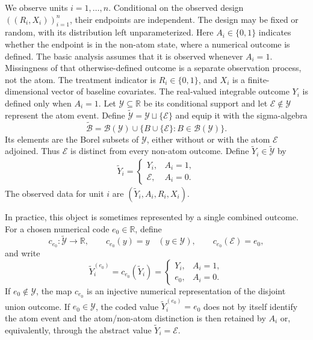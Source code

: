 \documentclass[11pt]{article}
\begin{document}
We observe units $i=1,\ldots,n$. Conditional on the observed design $((R_i,X_i))_{i=1}^n$, their endpoints are independent. The design may be fixed or random, with its distribution left unparameterized. Here $A_i\in\{0,1\}$ indicates whether the endpoint is in the non-atom state, where a numerical outcome is defined. The basic analysis assumes that it is observed whenever $A_i=1$. Missingness of that otherwise-defined outcome is a separate observation process, not the atom. The treatment indicator is $R_i\in\{0,1\}$, and $X_i$ is a finite-dimensional vector of baseline covariates. The real-valued integrable outcome $Y_i$ is defined only when $A_i=1$. Let $\mathcal{Y}\subseteq\mathbb{R}$ be its conditional support and let $\mathcal{E}\notin\mathcal{Y}$ represent the atom event. Define $\widetilde{\mathcal{Y}}=\mathcal{Y}\sqcup\{\mathcal{E}\}$ and equip it with the sigma-algebra
\[
\widetilde{\mathcal{B}}
  =\mathcal{B}(\mathcal{Y})
  \cup\{B\cup\{\mathcal{E}\}\colon B\in\mathcal{B}(\mathcal{Y})\}.
\]
Its elements are the Borel subsets of $\mathcal{Y}$, either without or with the atom $\mathcal{E}$ adjoined. Thus $\mathcal{E}$ is distinct from every non-atom outcome. Define $\widetilde{Y}_i\in\widetilde{\mathcal{Y}}$ by
\begin{align*}
  \widetilde{Y}_i
  =
  \begin{cases}
    Y_i, & A_i=1,\\
    \mathcal{E}, & A_i=0.
  \end{cases}
\end{align*}
The observed data for unit $i$ are $(\widetilde{Y}_i,A_i,R_i,X_i)$.

In practice, this object is sometimes represented by a single combined outcome. For a chosen numerical code $e_0\in\mathbb{R}$, define
\[
  c_{e_0}:\widetilde{\mathcal{Y}}\to\mathbb{R},
  \qquad
  c_{e_0}(y)=y \quad (y\in\mathcal{Y}),
  \qquad
  c_{e_0}(\mathcal{E})=e_0,
\]
and write
\[
  \widetilde{Y}_i^{(e_0)}
  =c_{e_0}(\widetilde{Y}_i)
  =
  \begin{cases}
    Y_i, & A_i=1,\\
    e_0, & A_i=0.
  \end{cases}
\]
If $e_0\notin\mathcal{Y}$, the map $c_{e_0}$ is an injective numerical representation of the disjoint union outcome. If $e_0\in\mathcal{Y}$, the coded value $\widetilde{Y}_i^{(e_0)}=e_0$ does not by itself identify the atom event and the atom/non-atom distinction is then retained by $A_i$ or, equivalently, through the abstract value $\widetilde{Y}_i=\mathcal{E}$.
\end{document}
